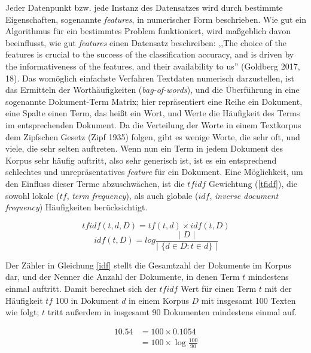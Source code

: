 Jeder Datenpunkt bzw. jede Instanz des Datensatzes wird durch bestimmte Eigenschaften, sogenannte \textit{features}, in numerischer Form beschrieben. Wie gut ein Algorithmus für ein bestimmtes Problem funktioniert, wird maßgeblich davon beeinflusst, wie 
\hspace{0.4mm}g\hspace{0.4mm}u\hspace{0.4mm}t\hspace{0.4mm} \textit{features} einen Datensatz beschreiben: ,,The choice of the features 
is crucial to the success of the classification accuracy, and is driven by the informativeness of the features, and their availability to us'' 
(Goldberg 2017, 18). Das womöglich einfachste Verfahren Textdaten numerisch darzustellen, ist das Ermitteln der Worthäufigkeiten 
(\textit{bag-of-words}), und die Überführung in eine sogenannte Dokument-Term Matrix; hier repräsentiert eine Reihe ein Dokument, eine Spalte einen Term, das heißt ein Wort, und Werte die Häufigkeit des Terms im entsprechenden Dokument. Da die Verteilung der Worte in einem Textkorpus 
dem Zipfschen Gesetz (Zipf 1935) folgen, gibt es wenige Worte, die sehr oft, und viele, die sehr selten auftreten. Wenn nun ein Term in 
jedem Dokument des Korpus sehr häufig auftritt, also sehr generisch ist, ist es ein entsprechend schlechtes und unrepräsentatives \textit{feature} für ein Dokument. Eine Möglichkeit, um den Einfluss dieser Terme abzuschwächen, ist die $tfidf$ Gewichtung (\ref{tfidf}), die sowohl lokale ($tf$, \textit{term frequency}), als auch globale ($idf$, \textit{inverse document frequency}) Häufigkeiten berücksichtigt.

\begin{equation}
\label{tfidf}
tfidf( t, d, D ) = tf( t, d ) \times idf( t, D )
\end{equation}
\begin{equation}
\label{idf}
idf( t, D ) = log \frac{ \text{| } D \text{ |} }{ \text{| } \{ d \in D : t \in d \} \text{ |} }
\end{equation}

Der Zähler in Gleichung \ref{idf} stellt die Gesamtzahl der Dokumente im Korpus dar, und der Nenner die Anzahl der Dokumente, 
in denen Term $t$ mindestens einmal auftritt. Damit berechnet sich der $tfidf$ Wert für einen Term $t$ mit der Häufigkeit 
$tf$ 100 in Dokument $d$ in einem Korpus $D$ mit insgesamt 100 Texten wie folgt; $t$ tritt außerdem in insgesamt 90 Dokumenten mindestens 
einmal auf.

\begin{equation}
  \label{eq:eqn2}
    \begin{aligned}
      10.54 &= 100 \times 0.1054        \\
            &=100 \times \log \frac{100}{90}        
    \end{aligned}
\end{equation}


